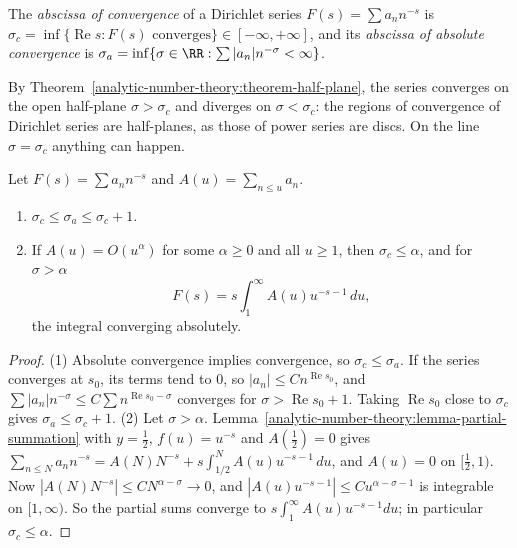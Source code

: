 \begin{definition}\label{analytic-number-theory:definition-abscissae}
The \emph{abscissa of convergence} of a Dirichlet series $F(s) = \sum a_nn^{-s}$ is $\sigma_c = \inf\{\operatorname{Re}s : F(s) \text{ converges}\} \in [-\infty, +\infty]$, and its \emph{abscissa
of absolute convergence} is $\sigma_a = \inf\{\sigma \in \RR : \sum|a_n|n^{-\sigma} < \infty\}$.
\end{definition}

By Theorem~\ref{analytic-number-theory:theorem-half-plane}, the series converges on the open half-plane $\sigma > \sigma_c$ and diverges on $\sigma < \sigma_c$: the regions of convergence of
Dirichlet series are half-planes, as those of power series are discs. On the line $\sigma = \sigma_c$ anything can happen.

\begin{proposition}\label{analytic-number-theory:proposition-abscissae}
Let $F(s) = \sum a_nn^{-s}$ and $A(u) = \sum_{n \leq u}a_n$.
\begin{enumerate}
\item $\sigma_c \leq \sigma_a \leq \sigma_c + 1$.
\item If $A(u) = O(u^\alpha)$ for some $\alpha \geq 0$ and all $u \geq 1$, then $\sigma_c \leq \alpha$, and for $\sigma > \alpha$
\[
F(s) = s\int_1^\infty A(u)u^{-s-1}\,du,
\]
the integral converging absolutely.
\end{enumerate}
\end{proposition}

\begin{proof}
(1) Absolute convergence implies convergence, so $\sigma_c \leq \sigma_a$. If the series converges at $s_0$, its terms tend to $0$, so $|a_n| \leq Cn^{\operatorname{Re}s_0}$, and
$\sum|a_n|n^{-\sigma} \leq C\sum n^{\operatorname{Re}s_0 - \sigma}$ converges for $\sigma > \operatorname{Re}s_0 + 1$. Taking $\operatorname{Re}s_0$ close to $\sigma_c$ gives
$\sigma_a \leq \sigma_c + 1$.
(2) Let $\sigma > \alpha$. Lemma~\ref{analytic-number-theory:lemma-partial-summation} with $y = \frac12$, $f(u) = u^{-s}$ and $A(\frac12) = 0$ gives
$\sum_{n \leq N}a_nn^{-s} = A(N)N^{-s} + s\int_{1/2}^NA(u)u^{-s-1}\,du$, and $A(u) = 0$ on $[\frac12, 1)$. Now $|A(N)N^{-s}| \leq CN^{\alpha - \sigma} \to 0$, and
$|A(u)u^{-s-1}| \leq Cu^{\alpha - \sigma - 1}$ is integrable on $[1, \infty)$. So the partial sums converge to $s\int_1^\infty A(u)u^{-s-1}du$; in particular $\sigma_c \leq \alpha$.
\end{proof}

